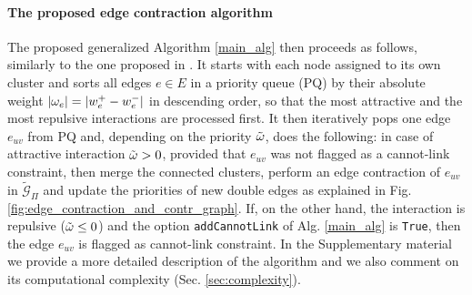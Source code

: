 \paragraph{The proposed edge contraction algorithm} The proposed generalized Algorithm \ref{main_alg} then proceeds as follows, similarly to the one proposed in \cite{levinkov2017comparative}. It starts with each node assigned to its own cluster and sorts all edges $e\in E$ in a priority queue (PQ) by their absolute weight $|\omega_e|=|w_e^+ - w_e^-|$ in descending order, so that the most attractive and the most repulsive interactions are processed first. It then iteratively pops one edge $e_{uv}$ from PQ and, depending on the priority $\tilde{\omega}$, does the following: in case of attractive interaction $\tilde{\omega}>0$, provided that $e_{uv}$ was not flagged as a cannot-link constraint, then merge the connected clusters, perform an edge contraction of $e_{uv}$ in $\tilde{\mathcal{G}}_\Pi$ and update the priorities of new double edges as explained in Fig. \ref{fig:edge_contraction_and_contr_graph}. 
If, on the other hand, the interaction is repulsive ($\tilde{\omega}\leq 0$) and the option \texttt{addCannotLink} of Alg. \ref{main_alg} is \texttt{True}, then the edge $e_{uv}$ is flagged as cannot-link constraint.
In the Supplementary material we provide a more detailed description of the algorithm and we also comment on its computational complexity (Sec. \ref{sec:complexity}).






